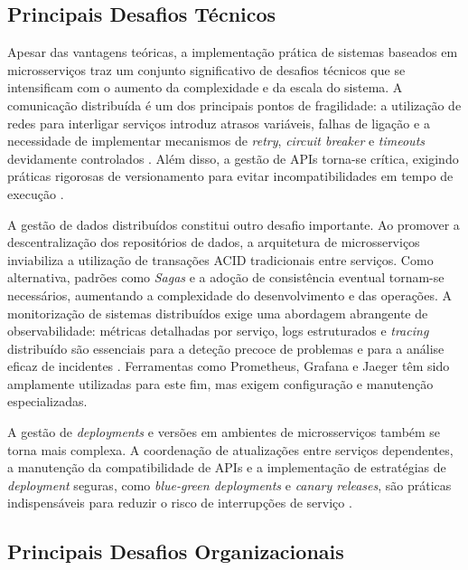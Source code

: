 \subsection{Principais Desafios Técnicos}

Apesar das vantagens teóricas, a implementação prática de sistemas baseados em microsserviços traz um conjunto significativo de desafios técnicos que se intensificam com o aumento da complexidade e da escala do sistema. A comunicação distribuída é um dos principais pontos de fragilidade: a utilização de redes para interligar serviços introduz atrasos variáveis, falhas de ligação e a necessidade de implementar mecanismos de \textit{retry}, \textit{circuit breaker} e \textit{timeouts} devidamente controlados \cite{Nygard2018,Newman2015}. Além disso, a gestão de APIs torna-se crítica, exigindo práticas rigorosas de versionamento para evitar incompatibilidades em tempo de execução \cite{Richardson2018}.

A gestão de dados distribuídos constitui outro desafio importante. Ao promover a descentralização dos repositórios de dados, a arquitetura de microsserviços inviabiliza a utilização de transações ACID tradicionais entre serviços. Como alternativa, padrões como \textit{Sagas} e a adoção de consistência eventual tornam-se necessários, aumentando a complexidade do desenvolvimento e das operações. A monitorização de sistemas distribuídos exige uma abordagem abrangente de observabilidade: métricas detalhadas por serviço, logs estruturados e \textit{tracing} distribuído são essenciais para a deteção precoce de problemas e para a análise eficaz de incidentes \cite{Burns2015}. Ferramentas como Prometheus, Grafana e Jaeger têm sido amplamente utilizadas para este fim, mas exigem configuração e manutenção especializadas.

A gestão de \textit{deployments} e versões em ambientes de microsserviços também se torna mais complexa. A coordenação de atualizações entre serviços dependentes, a manutenção da compatibilidade de APIs e a implementação de estratégias de \textit{deployment} seguras, como \textit{blue-green deployments} e \textit{canary releases}, são práticas indispensáveis para reduzir o risco de interrupções de serviço \cite{Humble2010}.

\subsection{Principais Desafios Organizacionais}


